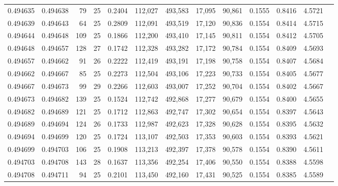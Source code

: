 \begin{tabular}{rrrrrrrrrrrrr}
0.494635 & 0.494638 &  79 &  25 &                                     0.2404 & 112,027 & 493,583 &  17,095 &  90,861 & 0.1555 & 0.8416 & 4.5721 \\
0.494639 & 0.494643 &  64 &  25 &                                     0.2809 & 112,091 & 493,519 &  17,120 &  90,836 & 0.1554 & 0.8414 & 4.5715 \\
0.494644 & 0.494648 & 109 &  25 &                                     0.1866 & 112,200 & 493,410 &  17,145 &  90,811 & 0.1554 & 0.8412 & 4.5705 \\
0.494648 & 0.494657 & 128 &  27 &                                     0.1742 & 112,328 & 493,282 &  17,172 &  90,784 & 0.1554 & 0.8409 & 4.5693 \\
0.494657 & 0.494662 &  91 &  26 &                                     0.2222 & 112,419 & 493,191 &  17,198 &  90,758 & 0.1554 & 0.8407 & 4.5684 \\
0.494662 & 0.494667 &  85 &  25 &                                     0.2273 & 112,504 & 493,106 &  17,223 &  90,733 & 0.1554 & 0.8405 & 4.5677 \\
0.494667 & 0.494673 &  99 &  29 &                                     0.2266 & 112,603 & 493,007 &  17,252 &  90,704 & 0.1554 & 0.8402 & 4.5667 \\
0.494673 & 0.494682 & 139 &  25 &                                     0.1524 & 112,742 & 492,868 &  17,277 &  90,679 & 0.1554 & 0.8400 & 4.5655 \\
0.494682 & 0.494689 & 121 &  25 &                                     0.1712 & 112,863 & 492,747 &  17,302 &  90,654 & 0.1554 & 0.8397 & 4.5643 \\
0.494689 & 0.494694 & 124 &  26 &                                     0.1733 & 112,987 & 492,623 &  17,328 &  90,628 & 0.1554 & 0.8395 & 4.5632 \\
0.494694 & 0.494699 & 120 &  25 &                                     0.1724 & 113,107 & 492,503 &  17,353 &  90,603 & 0.1554 & 0.8393 & 4.5621 \\
0.494699 & 0.494703 & 106 &  25 &                                     0.1908 & 113,213 & 492,397 &  17,378 &  90,578 & 0.1554 & 0.8390 & 4.5611 \\
0.494703 & 0.494708 & 143 &  28 &                                     0.1637 & 113,356 & 492,254 &  17,406 &  90,550 & 0.1554 & 0.8388 & 4.5598 \\
0.494708 & 0.494711 &  94 &  25 &                                     0.2101 & 113,450 & 492,160 &  17,431 &  90,525 & 0.1554 & 0.8385 & 4.5589 \\

\end{tabular}
